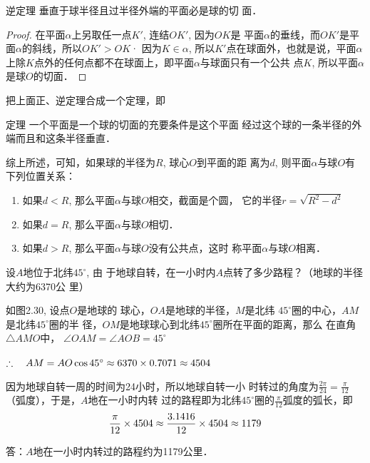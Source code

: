 \begin{blk}
  {逆定理} 垂直于球半径且过半径外端的平面必是球的切
面．  
\end{blk}

\begin{proof}
在平面$\alpha$上另取任一点$K'$, 连结$OK'$, 因为$OK$是
平面$\alpha$的垂线，而$OK'$是平面$\alpha$的斜线，所以$OK'>OK$· 
因为$K\in\alpha$, 所以$K'$点在球面外，也就是说，平面$\alpha$上除$K$点外的任何点都不在球面上，即平面$\alpha$与球面只有一个公共
点$K$, 所以平面$\alpha$是球$O$的切面．
\end{proof}

把上面正、逆定理合成一个定理，即

\begin{blk}
    {定理} 一个平面是一个球的切面的充要条件是这个平面
经过这个球的一条半径的外端而且和这条半径垂直．
\end{blk}

综上所述，可知，如果球的半径为$R$, 球心$O$到平面的距
离为$d$, 则平面$\alpha$与球$O$有下列位置关系：
\begin{enumerate}
\item 如果$d<R$, 那么平面$\alpha$与球$O$相交，截面是个圆，
它的半径$r=\sqrt{R^2-d^2}$
\item 如果$d=R$, 那么平面$\alpha$与球$O$相切．
\item 如果$d>R$, 那么平面$\alpha$与球$O$没有公共点，这时
称平面$\alpha$与球$O$相离．
\end{enumerate}

\begin{example}
    设$A$地位于北纬$45^{\circ}$, 由
于地球自转，在一小时内$A$点转了多少路程？（地球的半径大约为6370公
里）
\end{example}


\begin{solution}
    如图2.30, 设点$O$是地球的
    球心，$OA$是地球的半径，$M$是北纬
    $45^{\circ}$圈的中心，$AM$是北纬$45^{\circ}$圈的半
    径，$OM$是地球球心到北纬$45^{\circ}$圈所在平面的距离，那么
在直角$\triangle AMO$中，
$\angle OAM=\angle AOB=45^{\circ}$

$\therefore\quad AM=AO\cos45^{\circ}\approx 6370\times0.7071\approx 4504$

因为地球自转一周的时间为24小时，所以地球自转一小
时转过的角度为$\frac{2\pi}{24}=\frac{\pi}{12}$（弧度），于是，$A$地在一小时内转
过的路程即为北纬$45^{\circ}$圈的$\frac{\pi}{12}$弧度的弧长，即
\[\dfrac{\pi}{12}\times 4504\approx \dfrac{3.1416}{12}\times 4504\approx 1179\]

答：$A$地在一小时内转过的路程约为1179公里．
\end{solution}

